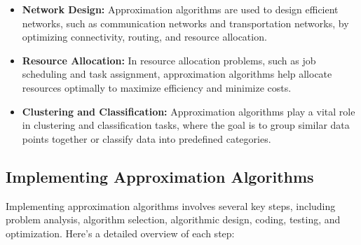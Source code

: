 \documentclass[12pt]{book} %
\begin{document}
\begin{itemize}
    \item \textbf{Network Design:} Approximation algorithms are used to design efficient networks, such as communication networks and transportation networks, by optimizing connectivity, routing, and resource allocation.
    \item \textbf{Resource Allocation:} In resource allocation problems, such as job scheduling and task assignment, approximation algorithms help allocate resources optimally to maximize efficiency and minimize costs.
    \item \textbf{Clustering and Classification:} Approximation algorithms play a vital role in clustering and classification tasks, where the goal is to group similar data points together or classify data into predefined categories.
\end{itemize}

\subsection{Implementing Approximation Algorithms}

Implementing approximation algorithms involves several key steps, including problem analysis, algorithm selection, algorithmic design, coding, testing, and optimization. Here's a detailed overview of each step:
\end{document}
